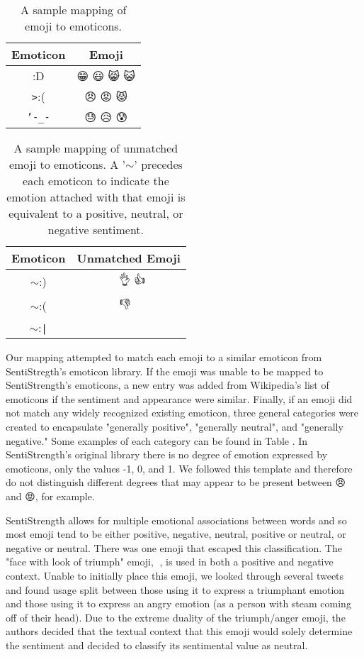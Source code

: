 \documentclass{acm_proc_article-sp}
\begin{document}
 \begin{table}[t]
 	\begin{tabular} {|c | c |}
		 \hline
	 	Emoticon & Emoji \\ \hline
		:D & 😁 😃 😸 😺 \\
		\texttt{>}:( & 😠 😡 😾 \\
		\texttt{'-\_-} & 😓 😥 😰\\
		\hline
 	\end{tabular}
 	\caption{A sample mapping of emoji to emoticons. }
 \end{table}
 
  \begin{table}[t]
  	\begin{tabular} {|c | c |}
  		\hline
  		Emoticon & Unmatched Emoji \\ \hline
  		$\sim$:) & 👏 👌 👍\\
  		$\sim$:(& 👎 💩\\
  		$\sim$:\texttt{|} & 👊\\
  		\hline
  	\end{tabular}
  	\caption{A sample mapping of unmatched emoji to emoticons. A '$\sim$' precedes each emoticon to indicate the emotion attached with that emoji is equivalent to a positive, neutral, or negative sentiment.}
  \end{table}
 
 Our mapping attempted to match each emoji to a similar emoticon from SentiStregth's emoticon library. 
 If the emoji was unable to be mapped to SentiStrength's emoticons, a new entry was added from Wikipedia's list of emoticons if the sentiment and appearance were similar.
 Finally, if an emoji did not match any widely recognized existing emoticon, three general categories were created to encapsulate "generally positive", "generally neutral", and "generally negative." Some examples of each category can be found in Table .
 In SentiStrength's original library there is no degree of emotion expressed by emoticons, only the values -1, 0, and 1. We followed this template and therefore do not distinguish different degrees that may appear to be present between 😠 and 😡, for example. 
 
 SentiStrength allows for multiple emotional associations between words and so most emoji tend to be either positive, negative, neutral, positive or neutral, or  negative or neutral. 
 There was one emoji that escaped this classification. 
 The "face with look of triumph" emoji, 😤, is used in both a positive and negative context.
 Unable to initially place this emoji, we looked through several tweets and found usage split between those using it to express a triumphant emotion and those using it to express an angry emotion (as a person with steam coming off of their head). 
 Due to the extreme duality of the triumph/anger emoji, the authors decided that the textual context that this emoji would solely determine the sentiment and decided to classify its sentimental value as neutral.
 
\end{document}
